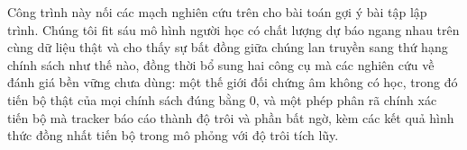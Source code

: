 Công trình này nối các mạch nghiên cứu trên cho bài toán gợi ý bài tập lập trình. Chúng tôi fit sáu mô hình người học có chất lượng dự báo ngang nhau trên cùng dữ liệu thật và cho thấy sự bất đồng giữa chúng lan truyền sang thứ hạng chính sách như thế nào, đồng thời bổ sung hai công cụ mà các nghiên cứu về đánh giá bền vững chưa dùng: một thế giới đối chứng âm không có học, trong đó tiến bộ thật của mọi chính sách đúng bằng 0, và một phép phân rã chính xác tiến bộ mà tracker báo cáo thành độ trôi và phần bất ngờ, kèm các kết quả hình thức đồng nhất tiến bộ trong mô phỏng với độ trôi tích lũy.
